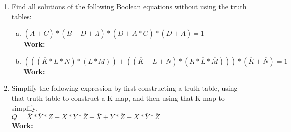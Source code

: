 \documentclass[11pt]{article}
\begin{document}
\begin{enumerate}
    \item Find all solutions of the following Boolean equations without using the truth tables:
    \begin{enumerate}[(a)]
        \item $(\overline{A} + C) * (\overline{B} + D + A) * (D + A * \overline{C}) * (\overline{D} + A) = 1$\\
        \textbf{Work:}
        \begin{center}
            
        \end{center}
        \item $(((\overline{K} * L * N) * (L * M)) + ((\overline{K} + L + N) * (K * \overline{L} * \overline{M}))) * (\overline{K} + \overline{N}) = 1$\\
        \textbf{Work:}
        \begin{center}
            
        \end{center}
    \end{enumerate}

    \item Simplify the following expression by first constructing a truth table, using that truth table to
    construct a K-map, and then using that K-map to simplify.\\
    $Q = \overline{X} * \overline{Y} * Z + X * Y * \overline{Z} + \overline{X} + Y * \overline{Z} + X * \overline{Y} * \overline{Z}$\\
    \textbf{Work:}
\end{enumerate}
\end{document}
